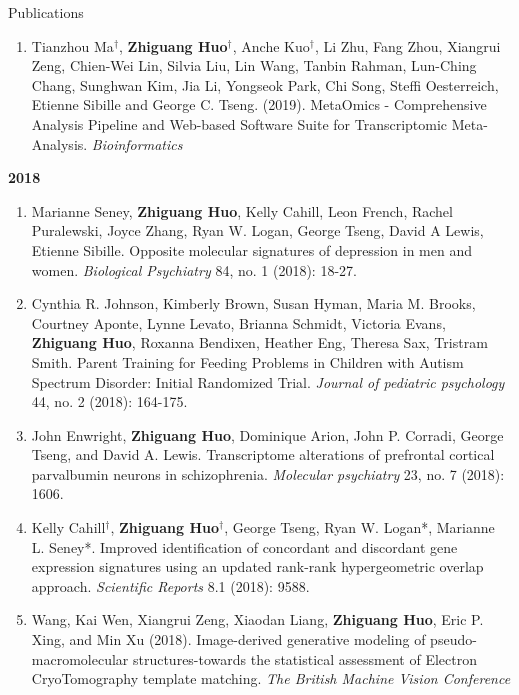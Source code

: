 \documentclass{resume} %
\begin{document}
\begin{rSection}{Publications}
\begin{enumerate}[noitemsep,topsep=0pt]
						
\item Tianzhou Ma$^\dagger$, {\bf  Zhiguang Huo$^\dagger$}, Anche Kuo$^\dagger$, Li Zhu, Fang Zhou, Xiangrui Zeng, Chien-Wei Lin, Silvia Liu, Lin Wang, Tanbin Rahman, Lun-Ching Chang, Sunghwan Kim, Jia Li, Yongseok Park, Chi Song, Steffi Oesterreich, Etienne Sibille and George C. Tseng. (2019). 
MetaOmics - Comprehensive Analysis Pipeline and Web-based Software Suite for Transcriptomic Meta-Analysis. \emph{Bioinformatics}  



\end{enumerate}

\textbf{2018}
\begin{enumerate}[noitemsep,topsep=0pt, resume]

\item Marianne Seney,  {\bf Zhiguang Huo},  Kelly Cahill, Leon French, Rachel Puralewski, Joyce Zhang, Ryan W. Logan, George Tseng, David A Lewis, Etienne Sibille. Opposite molecular signatures of depression in men and women. \emph{Biological Psychiatry}  84, no. 1 (2018): 18-27.

\item 
Cynthia R. Johnson, Kimberly Brown, Susan Hyman, Maria M. Brooks, Courtney Aponte, Lynne Levato, Brianna Schmidt,
Victoria Evans, {\bf Zhiguang Huo},  Roxanna Bendixen, Heather Eng, Theresa Sax, Tristram Smith.
Parent Training for Feeding Problems in Children with Autism Spectrum Disorder: Initial Randomized Trial. \emph{Journal of pediatric psychology} 44, no. 2 (2018): 164-175.

\item 
John Enwright, {\bf Zhiguang Huo}, Dominique Arion, John P. Corradi, George Tseng, and David A. Lewis. 
Transcriptome alterations of prefrontal cortical parvalbumin neurons in schizophrenia. 
\emph{Molecular psychiatry} 23, no. 7 (2018): 1606.


\item Kelly Cahill$^\dagger$, {\bf  Zhiguang Huo$^\dagger$}, George Tseng, Ryan W. Logan*, Marianne L. Seney*.
Improved identification of concordant and discordant gene expression signatures using an updated rank-rank hypergeometric overlap approach. \emph{Scientific Reports} 8.1 (2018): 9588.

\item 
Wang, Kai Wen, Xiangrui Zeng, Xiaodan Liang, {\bf Zhiguang Huo}, Eric P. Xing, and Min Xu (2018). Image-derived generative modeling of pseudo-macromolecular structures-towards the statistical assessment of Electron CryoTomography template matching. \emph{The British Machine Vision Conference}


\end{enumerate}
\end{rSection}
\end{document}
